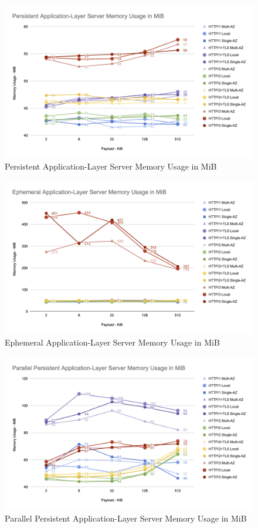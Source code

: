 \begin{figure}[h!]
    \centering
    \includegraphics[width=\linewidth]{figures/charts/Persistent Application-Layer Server Memory Usage in MiB.png}
    \caption{Persistent Application-Layer Server Memory Usage in MiB}
    \label{fig:persistent_server_app_memory}
\end{figure}

\begin{figure}[h!]
    \centering
    \includegraphics[width=\linewidth]{figures/charts/Ephemeral Application-Layer Server Memory Usage in MiB.png}
    \caption{Ephemeral Application-Layer Server Memory Usage in MiB}
    \label{fig:ephemeral_server_app_memory}
\end{figure}

\begin{figure}[h!]
    \centering
    \includegraphics[width=\linewidth]{figures/charts/Parallel Persistent Application-Layer Server Memory Usage in MiB.png}
    \caption{Parallel Persistent Application-Layer Server Memory Usage in MiB}
    \label{fig:parallel_server_app_memory}
\end{figure}
